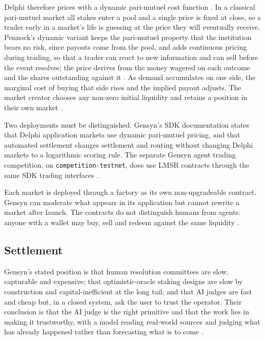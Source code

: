 Delphi therefore prices with a dynamic pari-mutuel cost function
\cite{pennock2004dpm,gensyn2026delphi}. In a classical pari-mutuel market all stakes enter
a pool and a single price is fixed at close, so a trader early in a market's life is
guessing at the price they will eventually receive. Pennock's dynamic variant keeps the
pari-mutuel property that the institution bears no risk, since payouts come from the pool,
and adds continuous pricing during trading, so that a trader can react to new information
and can sell before the event resolves; the price derives from the money wagered on each
outcome and the shares outstanding against it \cite{pennock2004dpm}. As demand accumulates on one side, the marginal cost of buying that
side rises and the implied payout adjusts. The market creator chooses any non-zero initial
liquidity and retains a position in their own market \cite{gensyn2026delphi}.

Two deployments must be distinguished. Gensyn's SDK documentation states that Delphi application markets use dynamic
pari-mutuel pricing, and that automated settlement changes settlement and routing without
changing Delphi markets to a logarithmic scoring rule. The separate Gensyn agent trading
competition, on \texttt{competition-testnet}, does use LMSR contracts through the same SDK
trading interfaces \cite{gensyn2026sdk}.

Each market is deployed through a factory as its own non-upgradeable contract. Gensyn can
moderate what appears in its application but cannot rewrite a market after launch. The
contracts do not distinguish humans from agents: anyone with a wallet may buy, sell and
redeem against the same liquidity \cite{gensyn2026delphi}.

\subsection{Settlement}

Gensyn's stated position is that human resolution committees are slow, capturable and
expensive; that optimistic-oracle staking designs are slow by construction and
capital-inefficient at the long tail; and that AI judges are fast and cheap but, in a
closed system, ask the user to trust the operator. Their conclusion is that the AI judge is
the right primitive and that the work lies in making it trustworthy, with a model reading
real-world sources and judging what has already happened rather than forecasting what is to
come \cite{gensyn2026delphi}.

